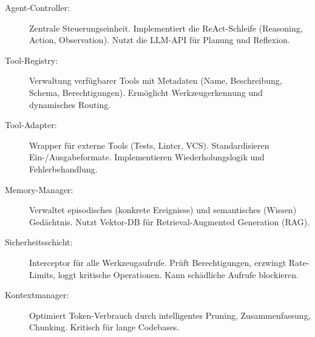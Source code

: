 \begin{sloppypar}
\begin{description}
  \item[Agent-Controller:] Zentrale Steuerungseinheit. Implementiert die ReAct-Schleife (Reasoning, Action, Observation). Nutzt die LLM-API für Planung und Reflexion.
  
  \item[Tool-Registry:] Verwaltung verfügbarer Tools mit Metadaten (Name, Beschreibung, Schema, Berechtigungen). Ermöglicht Werkzeugerkennung und dynamisches Routing.
  
  \item[Tool-Adapter:] Wrapper für externe Tools (Tests, Linter, VCS). Standardisieren Ein-/Ausgabeformate. Implementieren Wiederholungslogik und Fehlerbehandlung.
  
  \item[Memory-Manager:] Verwaltet episodisches (konkrete Ereignisse) und semantisches (Wissen) Gedächtnis. Nutzt Vektor-DB für Retrieval-Augmented Generation (RAG).
  
  \item[Sicherheitsschicht:] Interceptor für alle Werkzeugaufrufe. Prüft Berechtigungen, erzwingt Rate-Limits, loggt kritische Operationen. Kann schädliche Aufrufe blockieren.
  
  \item[Kontextmanager:] Optimiert Token-Verbrauch durch intelligentes Pruning, Zusammenfassung, Chunking. Kritisch für lange Codebases.
\end{description}
\end{sloppypar}

